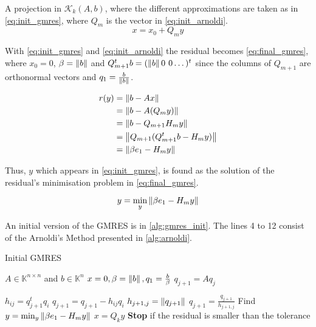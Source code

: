 
A projection in $\mathcal{K}_{k}(A,b)$, where the different approximations are taken as in \ref{eq:init_gmres}, where $Q_{m}$ is the vector in \ref{eq:init_arnoldi}.
\begin{equation}\label{eq:init_gmres}
    x = x_{0} + Q_{m}y
\end{equation}

With \ref{eq:init_gmres} and \ref{eq:init_arnoldi} the residual becomes \ref{eq:final_gmres}, where $x_{0} = 0$, $\beta=\left\lVert b\right\rVert$ and $Q_{m+1}^{t}b=(\left\lVert b\right\rVert 0 \hspace{0.05in} 0\dots)^{t}$ since the columns of $Q_{m+1}$ are orthonormal vectors and $q_{1} = \frac{b}{\left\lVert b\right\rVert}$.

\begin{align} \label{eq:final_gmres}
    \begin{split}
        r(y) &= \left\lVert b - Ax\right\rVert\\
        &= \left\lVert b - A(Q_{m}y)\right\rVert\\
        &= \left\lVert b-Q_{m+1}H_{m}y\right\rVert \\
        &= \left\lVert Q_{m+1}(Q_{m+1}^{t}b-H_{m}y)\right\rVert \\
        &= \left\lVert\beta e_{1} - H_{m}y\right\rVert
    \end{split}
\end{align}


Thus, $y$ which appears in \ref{eq:init_gmres}, is found as the solution of the residual's minimisation problem  in \ref{eq:final_gmres}.

\begin{equation}\label{eq:y_gmres}
    y = \min_{y} \left\lVert\beta e_{1} - H_{m}y\right\rVert
\end{equation}

An initial version of the GMRES is in \ref{alg:gmres_init}. The lines 4 to 12 consist of the Arnoldi's Method presented in \ref{alg:arnoldi}.

\begin{algorithm}
    \caption{Initial GMRES}\label{alg:gmres_init}
    \begin{algorithmic}[1]
        \State $A \in \mathbb{K}^{n \times n}$ and $b\in \mathbb{K}^{n}$
        \State $x=0, \beta=\left\lVert b\right\rVert,q_{1}=\frac{b}{\beta}$
        \State $q_{j+1} = Aq_{j}$

        \State $h_{ij}= q_{j+1}^{t}q_{i}$
        \State $q_{j+1} = q_{j+1} - h_{ij}q_{i}$
        \EndFor
        \State $h_{j+1,j}=\left\lVert q_{j+1}\right\rVert$
        \State $q_{j+1} = \frac{q_{j+1}}{h_{j+1,j}}$
        \EndFor
        \State Find $y = \min_{y} \left\lVert\beta e_{1} - H_{m}y\right\rVert$
        \State $x = Q_{k}y$
        \State \textbf{Stop} if the residual is smaller than the tolerance
        \EndFor
    \end{algorithmic}
\end{algorithm}

